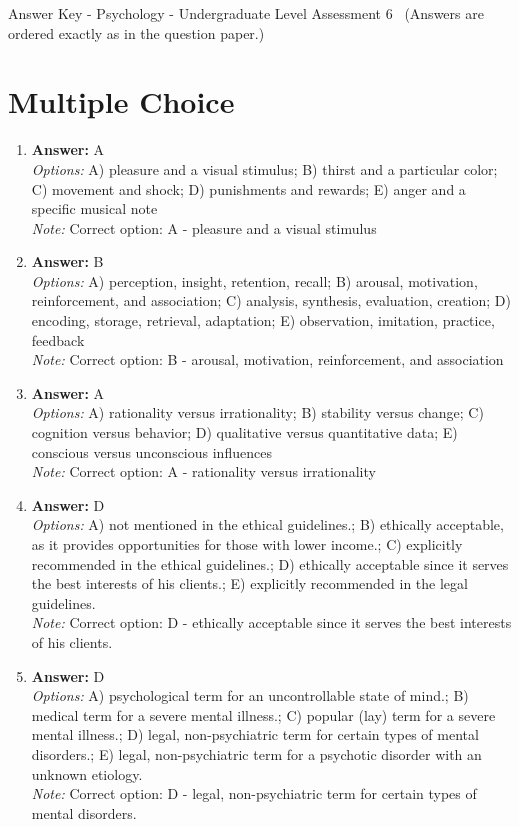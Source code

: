 \documentclass[12pt]{article}
\begin{document}
\begin{center}
Answer Key - Psychology - Undergraduate Level Assessment 6 \
\small (Answers are ordered exactly as in the question paper.)
\end{center}

\section*{Multiple Choice}
\begin{enumerate}[label=\arabic*.]
\item \textbf{Answer:} A
\\ \textit{Options:} A) pleasure and a visual stimulus; B) thirst and a particular color; C) movement and shock; D) punishments and rewards; E) anger and a specific musical note
\\ \textit{Note:} Correct option: A - pleasure and a visual stimulus
\item \textbf{Answer:} B
\\ \textit{Options:} A) perception, insight, retention, recall; B) arousal, motivation, reinforcement, and association; C) analysis, synthesis, evaluation, creation; D) encoding, storage, retrieval, adaptation; E) observation, imitation, practice, feedback
\\ \textit{Note:} Correct option: B - arousal, motivation, reinforcement, and association
\item \textbf{Answer:} A
\\ \textit{Options:} A) rationality versus irrationality; B) stability versus change; C) cognition versus behavior; D) qualitative versus quantitative data; E) conscious versus unconscious influences
\\ \textit{Note:} Correct option: A - rationality versus irrationality
\item \textbf{Answer:} D
\\ \textit{Options:} A) not mentioned in the ethical guidelines.; B) ethically acceptable, as it provides opportunities for those with lower income.; C) explicitly recommended in the ethical guidelines.; D) ethically acceptable since it serves the best interests of his clients.; E) explicitly recommended in the legal guidelines.
\\ \textit{Note:} Correct option: D - ethically acceptable since it serves the best interests of his clients.
\item \textbf{Answer:} D
\\ \textit{Options:} A) psychological term for an uncontrollable state of mind.; B) medical term for a severe mental illness.; C) popular (lay) term for a severe mental illness.; D) legal, non-psychiatric term for certain types of mental disorders.; E) legal, non-psychiatric term for a psychotic disorder with an unknown etiology.
\\ \textit{Note:} Correct option: D - legal, non-psychiatric term for certain types of mental disorders.
\end{enumerate}
\end{document}
